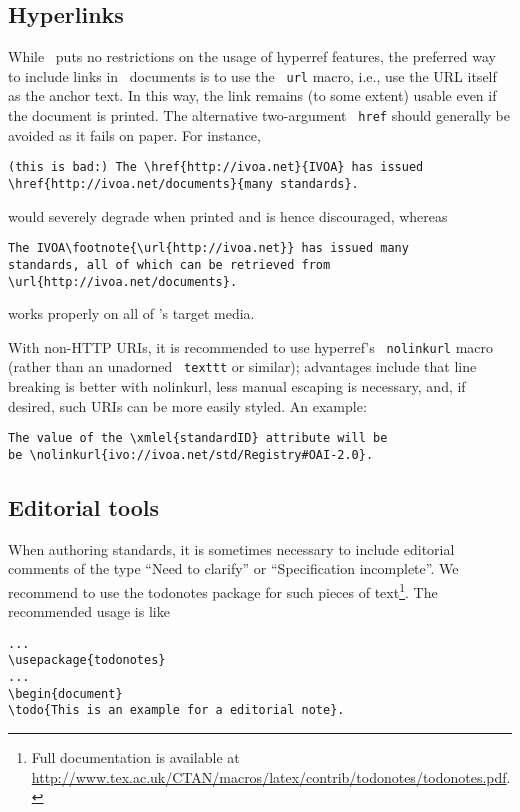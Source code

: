 \documentclass[11pt,a4paper]{ivoa}
\newcommand{\texword}[1]{\texttt{\color{texcolor} #1}}
\begin{document}
\subsection{Hyperlinks}

While \ivoatex\ puts no restrictions on the usage of hyperref features,
the preferred way to include links in \ivoatex\ documents is to use the
\texword{url} macro, i.e., use the URL itself as the anchor text.  In
this way, the link remains (to some extent) usable even if the document
is printed.  The alternative two-argument \texword{href} should
generally be avoided as it fails on paper.  For instance,
\begin{lstlisting}
(this is bad:) The \href{http://ivoa.net}{IVOA} has issued
\href{http://ivoa.net/documents}{many standards}.
\end{lstlisting}
would severely degrade when printed and is hence discouraged, whereas
\begin{lstlisting}
The IVOA\footnote{\url{http://ivoa.net}} has issued many 
standards, all of which can be retrieved from 
\url{http://ivoa.net/documents}.
\end{lstlisting}
works properly on all of \ivoatex's target media.

With non-HTTP URIs, it is recommended to use hyperref's
\texword{nolinkurl} macro (rather than an unadorned \texword{texttt} or
similar); advantages include that line breaking is better with
nolinkurl, less manual escaping is necessary, and, if desired, 
such URIs can be more easily styled.  An example:

\begin{lstlisting}
The value of the \xmlel{standardID} attribute will be
be \nolinkurl{ivo://ivoa.net/std/Registry#OAI-2.0}.
\end{lstlisting}

\subsection{Editorial tools}

When authoring standards, it is sometimes necessary to include
editorial comments of the type ``Need to clarify'' or ``Specification
incomplete''.  We recommend to use the todonotes package for such
pieces of text\footnote{Full documentation is available at
\url{http://www.tex.ac.uk/CTAN/macros/latex/contrib/todonotes/todonotes.pdf}.}.
The recommended usage is like
\begin{lstlisting}
...
\usepackage{todonotes}
...
\begin{document}
\todo{This is an example for a editorial note}.
\end{lstlisting}
\end{document}
